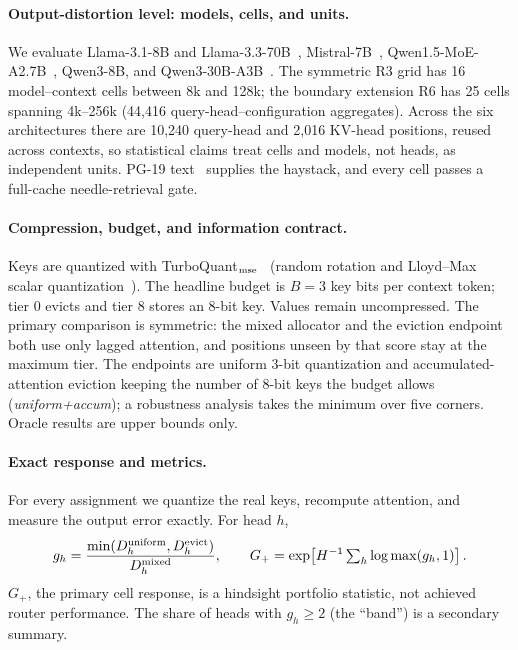 \documentclass{article}
\newcommand{\gplus}{G_{+}}
\theoremstyle{definition}
\begin{document}
\paragraph{Output-distortion level: models, cells, and units.}
We evaluate Llama-3.1-8B and Llama-3.3-70B~\citep{grattafiori2024llama3}, Mistral-7B~\citep{jiang2023mistral}, Qwen1.5-MoE-A2.7B~\citep{qwen2024moe}, Qwen3-8B, and Qwen3-30B-A3B~\citep{yang2025qwen3}.  The symmetric R3 grid has 16 model--context cells between 8k and 128k; the boundary extension R6 has 25 cells spanning 4k--256k (44,416 query-head--configuration aggregates).  Across the six architectures there are 10,240 query-head and 2,016 KV-head positions, reused across contexts, so statistical claims treat cells and models, not heads, as independent units.  PG-19 text~\citep{rae2020pg19} supplies the haystack, and every cell passes a full-cache needle-retrieval gate.

\paragraph{Compression, budget, and information contract.}
Keys are quantized with TurboQuant$_{\rm mse}$~\citep{zandieh2025turboquant} (random rotation and Lloyd--Max scalar quantization~\citep{lloyd1982least}).  The headline budget is $B=3$ key bits per context token; tier 0 evicts and tier 8 stores an 8-bit key.  Values remain uncompressed.  The primary comparison is symmetric: the mixed allocator and the eviction endpoint both use only lagged attention, and positions unseen by that score stay at the maximum tier.  The endpoints are uniform 3-bit quantization and accumulated-attention eviction keeping the number of 8-bit keys the budget allows (\emph{uniform+accum}); a robustness analysis takes the minimum over five corners.  Oracle results are upper bounds only.

\paragraph{Exact response and metrics.}
For every assignment we quantize the real keys, recompute attention, and measure the output error exactly.  For head $h$,
\begin{equation}
 g_h=\frac{\min(D_h^{\rm uniform},D_h^{\rm evict})}{D_h^{\rm mixed}},
 \qquad
 \gplus=\exp\!\left[H^{-1}\textstyle\sum_h\log\max(g_h,1)\right].
 \label{eq:metrics}
\end{equation}
$\gplus$, the primary cell response, is a hindsight portfolio statistic, not achieved router performance.  The share of heads with $g_h\ge2$ (the ``band'') is a secondary summary.
\end{document}
